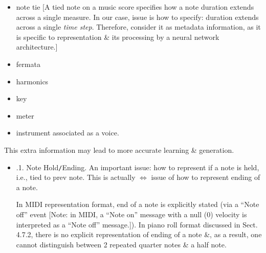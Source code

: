 \documentclass{article}
\begin{document}
\begin{itemize}
\begin{itemize}
\begin{itemize}
			\item note tie [A tied note on a music score specifies how a note duration extends across a single measure. In our case, issue is how to specify: duration extends across a single {\it time step}. Therefore, consider it as metadata information, as it is specific to representation \& its processing by a neural network architecture.]
			\item fermata
			\item harmonics
			\item key
			\item meter
			\item instrument associated as a voice.
		\end{itemize}
		This extra information may lead to more accurate learning \& generation.
		\begin{itemize}
			\item {.1. Note Hold{\tt/}Ending.} An important issue: how to represent if a note is held, i.e., tied to prev note. This is actually $\Leftrightarrow$ issue of how to represent ending of a note.

			In MIDI representation format, end of a note is explicitly stated (via a ``Note off'' event [Note: in MIDI, a ``Note on'' message with a null (0) velocity is interpreted as a ``Note off'' message.]). In piano roll format discussed in Sect. 4.7.2, there is no explicit representation of ending of a note \&, as a result, one cannot distinguish between 2 repeated quarter notes \& a half note.


\end{itemize}
\end{itemize}
\end{itemize}
\end{document}
